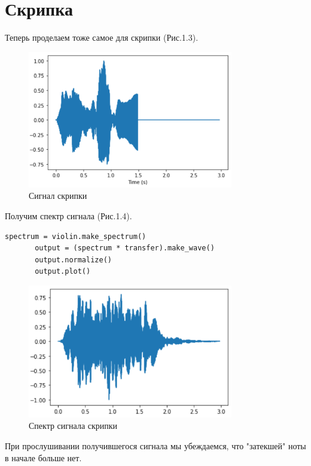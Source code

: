 \documentclass[a4paper,12pt]{report}
\begin{document}
\section{Скрипка}
    Теперь проделаем тоже самое для скрипки (Рис.1.3).
\begin{figure}[H]
        \centering
        \includegraphics[width=0.8\textwidth]{fig1-3.PNG}
        \caption{Сигнал скрипки}
        \label{fig:fig1-3}
\end{figure} 

    Получим спектр сигнала (Рис.1.4).
\begin{lstlisting}[caption=Получение спектра сигнала]
       spectrum = violin.make_spectrum()
       output = (spectrum * transfer).make_wave()
       output.normalize()
       output.plot()
\end{lstlisting}
\begin{figure}[H]
        \centering
        \includegraphics[width=0.8\textwidth]{fig1-4.PNG}
        \caption{Спектр сигнала скрипки}
        \label{fig:fig1-4}
\end{figure}  
       
    При прослушивании получившегося сигнала мы убеждаемся, что "затекшей" ноты в начале больше нет.
\end{document}
